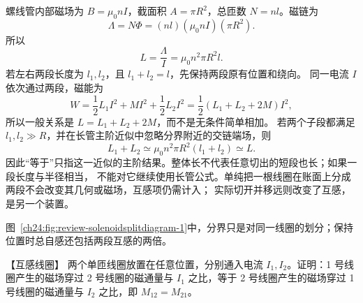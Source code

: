 {\begin{xesolution}
螺线管内部磁场为 $B=\mu_0nI$，截面积 $A=\pi R^2$，总匝数 $N=nl$。磁链为
\begin{equation}
  \Lambda=N\Phi=(nl)(\mu_0nI)(\pi R^2).
\end{equation}
所以
\begin{equation}
  \boxed{L=\frac\Lambda I=\mu_0n^2\pi R^2l}.
\end{equation}
若左右两段长度为 $l_1,l_2$，且 $l_1+l_2=l$，先保持两段原有位置和绕向。
同一电流 $I$ 依次通过两段，磁能为
\[
 W=\frac12L_1I^2+MI^2+\frac12L_2I^2
   =\frac12(L_1+L_2+2M)I^2,
\]
所以一般关系是 $L=L_1+L_2+2M$，而不是无条件简单相加。
若两个子段都满足 $l_1,l_2\gg R$，并在长管主阶近似中忽略分界附近的交链端场，则
\begin{equation}
  L_1+L_2\simeq\mu_0n^2\pi R^2(l_1+l_2)\simeq L.
\end{equation}
因此“等于”只指这一近似的主阶结果。整体长不代表任意切出的短段也长；如果一段长度与半径相当，
不能对它继续使用长管公式。单纯把一根线圈在账面上分成两段不会改变其几何或磁场，互感项仍需计入；
实际切开并移远则改变了互感，是另一个装置。

图~\ref{ch24:fig:review-solenoidsplitdiagram-1}中，分界只是对同一线圈的划分；保持位置时总自感还包括两段互感的两倍。
\par\noindent\begin{minipage}{\linewidth}
\solenoidSplitDiagram
{}
\end{minipage}\par\medskip
\end{xesolution}



\begin{origexamplebox}{【互感线圈】}\label{ch24:ex:s40-9-18}
两个单匝线圈放置在任意位置，分别通入电流 $I_1,I_2$。证明：1 号线圈产生的磁场穿过 2 号线圈的磁通量与 $I_1$ 之比，等于 2 号线圈产生的磁场穿过 1 号线圈的磁通量与 $I_2$ 之比，即 $M_{12}=M_{21}$。
\begin{center}\end{center}


\end{origexamplebox}}
